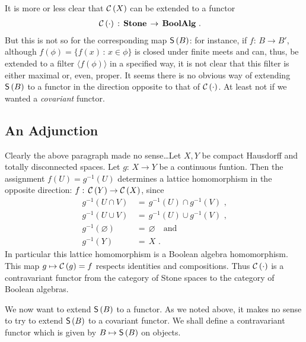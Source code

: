 \theoremstyle{plain}
\newtheorem{thmBoolIsCharOfSpec}{Theorem}[section]

\theoremstyle{remark}
\newtheorem*{remarkTheOtherMaximalityConditions}{Remark}
\newtheorem*{remarkShorterProof}{Remark}


It is more or less clear that $\mathcal{C}\left(X\right)$ can be extended
to a functor
\begin{align*}
	\mathcal{C}\left(\cdot\right) & \,:\,\mathbf{Stone}\,\rightarrow\,
		\mathbf{BoolAlg}
	\text{ .}
\end{align*}
%
But this is not so for the corresponding map $\mathsf{S}\left(B\right)$:
for instance, if $f:\,B\rightarrow B'$, although
$f(\phi)=\{f(x)\,:\,x\in\phi\}$ is closed under finite meets
and can, thus, be extended to a filter $\langle f(\phi)\rangle$
in a specified way, it is not clear that this filter is either
maximal or, even, proper. It seems there is no obvious way of
extending $\mathsf{S}\left(B\right)$ to a functor in the direction opposite
to that of $\mathcal{C}\left(\cdot\right)$. At least not if we wanted a
\emph{covariant} functor.

\subsection{An Adjunction}
Clearly the above paragraph made no sense\dots Let $X,Y$ be
compact Hausdorff and totally disconnected spaces. Let
$g:\,X\rightarrow Y$ be a continuous funtion. Then the assignment
$f(U) =g^{-1}(U)$ determines a lattice homomorphism in the
opposite direction: $f:\,\mathcal{C}\left(Y\right)\rightarrow\mathcal{C}\left(X\right)$, since
\begin{align*}
	g^{-1}(U\cap V) & \,=\, g^{-1}(U)\cap g^{-1}(V) \text{ ,}\\
	g^{-1}(U\cup V) & \,=\, g^{-1}(U)\cup g^{-1}(V) \text{ ,}\\
	g^{-1}(\varnothing) & \,=\, \varnothing \quad\text{and}\\
	g^{-1}(Y) & \,=\, X
	\text{ .}
\end{align*}
%
In particular this lattice homomorphism is a Boolean algebra
homomorphism. This map $g\mapsto \mathcal{C}\left(g\right)=f$ respects identities
and compositions. Thus $\mathcal{C}\left(\cdot\right)$ is a contravariant functor
from the category of Stone spaces to the category of Boolean
algebras.

We now want to extend $\mathsf{S}\left(B\right)$ to a functor. As we noted above,
it makes no sense to try to extend $\mathsf{S}\left(B\right)$ to a covariant functor.
We shall define a contravariant functor which is given by
$B\mapsto\mathsf{S}\left(B\right)$ on objects.

